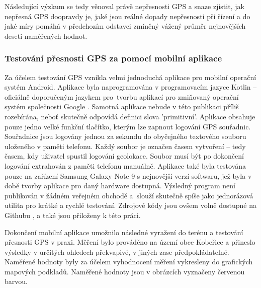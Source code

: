\documentclass[czech, bachelor]{diploma}
\begin{document}
Následující výzkum se tedy věnoval právě nepřesnosti GPS a snaze zjistit, jak nepřesná GPS doopravdy je, jaké jsou reálné dopady
nepřesnosti při řízení a do jaké míry pomáhá v předchozím odstavci zmíněný vážený průměr nejnovějších deseti naměřených hodnot.

\subsubsection{Testování přesnosti GPS za pomocí mobilní aplikace}

Za účelem testování GPS vznikla velmi jednoduchá aplikace pro mobilní operační systém Android. Aplikace byla naprogramována
v programovacím jazyce Kotlin -- oficiálně doporučeným jazykem pro~tvorbu aplikací pro zmiňovaný operační systém společnosti
Google \cite{kotlin-android-source}. Samotná aplikace nebude v této publikaci příliš rozebírána, neboť skutečně odpovídá definici
slova 'primitivní'. Aplikace obsahuje pouze jedno velké funkční tlačítko, kterým lze zapnout logování GPS souřadnic. Souřadnice
jsou logovány jednou za sekundu do obyčejného textového souboru uloženého v paměti telefonu. Každý soubor je označen časem
vytvoření -- tedy časem, kdy uživatel spustil logování geolokace. Soubor musí být po dokončení logování extrahován z paměti
telefonu manuálně. Aplikace také byla testována pouze na zařízení Samsung Galaxy Note 9 s nejnovější verzí softwaru, jež byla
v době tvorby aplikace pro daný hardware dostupná. Výsledný program není publikován v žádném veřejném obchodě a~slouží skutečně
spíše jako jednorázová utilita pro krátké a rychlé testování. Zdrojové kódy jsou ovšem volně dostupné na Githubu
\cite{geologger-source}, a také jsou přiloženy k této práci.

Dokončení mobilní aplikace umožnilo následné vyražení do terénu a testování přesnosti GPS v praxi. Měření bylo prováděno na území
obce Kobeřice a přineslo výsledky v určitých ohledech překvapivé, v jiných zase předpokládatelné. Naměřené hodnoty byly za účelem
vyhodnocení měření vykresleny do grafických mapových podkladů. Naměřené hodnoty jsou v obrázcích vyznačeny červenou barvou.
\end{document}
